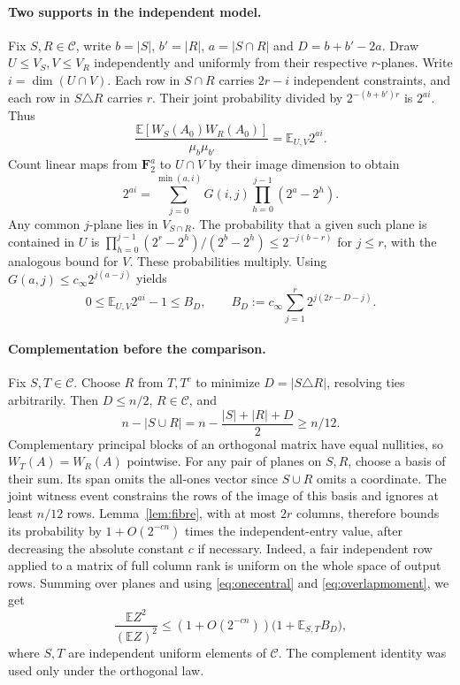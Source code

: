 \documentclass[11pt]{article}
\theoremstyle{remark}\newtheorem*{remark}{Remark}
\begin{document}
\paragraph{Two supports in the independent model.}
Fix $S,R\in\mathcal C$, write $b=|S|$, $b'=|R|$,
$a=|S\cap R|$ and $D=b+b'-2a$. Draw $U\le V_S,V\le V_R$
independently and uniformly from their respective $r$-planes.
Write $i=\dim(U\cap V)$. Each row in $S\cap R$ carries $2r-i$
independent constraints, and each row in $S\triangle R$ carries
$r$. Their joint probability divided by $2^{-(b+b')r}$ is $2^{ai}$.
Thus
\[
 \frac{\mathbb E[W_S(A_0)W_R(A_0)]}{\mu_b\mu_{b'}}
 =\mathbb E_{U,V}2^{ai}.
\]
Count linear maps from $\mathbf F_2^a$ to $U\cap V$ by their image
dimension to obtain
\[
 2^{ai}=\sum_{j=0}^{\min(a,i)}G(i,j)\prod_{h=0}^{j-1}(2^a-2^h).
\]
Any common $j$-plane lies in $V_{S\cap R}$. The probability that a
given such plane is contained in $U$ is
$\prod_{h=0}^{j-1}(2^r-2^h)/(2^b-2^h)\le 2^{-j(b-r)}$
for $j\le r$, with the analogous bound for $V$.
These probabilities multiply. Using
$G(a,j)\le c_\infty 2^{j(a-j)}$ yields
\begin{equation}\label{eq:overlapmoment}
 0\le \mathbb E_{U,V}2^{ai}-1
 \le B_D,\qquad
 B_D:=c_\infty\sum_{j=1}^r 2^{j(2r-D-j)}.
\end{equation}

\paragraph{Complementation before the comparison.}
Fix $S,T\in\mathcal C$. Choose $R$ from $T,T^c$ to minimize
$D=|S\triangle R|$, resolving ties arbitrarily. Then $D\le n/2$,
$R\in\mathcal C$, and
\[
 n-|S\cup R|=n-\frac{|S|+|R|+D}{2}\ge n/12.
\]
Complementary principal blocks of an orthogonal matrix have equal
nullities, so $W_T(A)=W_R(A)$ pointwise. For any pair of planes on
$S,R$, choose a basis of their sum. Its span omits the all-ones vector
since $S\cup R$ omits a coordinate. The joint witness event constrains
the rows of the image of this basis and ignores at least $n/12$ rows.
Lemma~\ref{lem:fibre}, with at most $2r$ columns, therefore bounds its
probability by $1+O(2^{-c n})$ times the independent-entry value,
after decreasing the absolute constant $c$ if necessary. Indeed, a fair independent row applied to a matrix of full column rank is uniform on the whole space of output rows. Summing over
planes and using \eqref{eq:onecentral} and \eqref{eq:overlapmoment}, we get
\[
 \frac{\mathbb E Z^2}{(\mathbb E Z)^2}
 \le (1+O(2^{-c n}))\bigl(1+\mathbb E_{S,T} B_D\bigr),
\]
where $S,T$ are independent uniform elements of $\mathcal C$.
The complement identity was used only under the orthogonal law.
\end{document}
